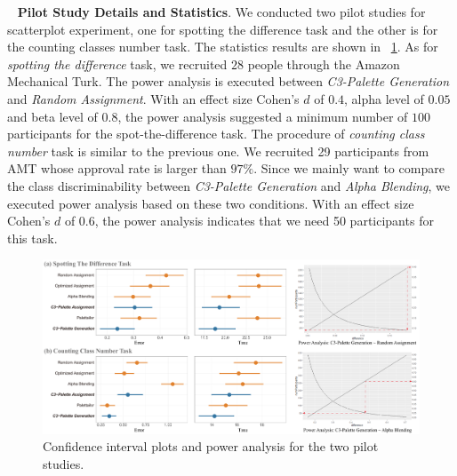 \documentclass[review,onecolumn]{vgtc}                %
\newcommand{\myparagraph}[1]{\mbox{\ } \newline \noindent \textbf{#1}}
\renewcommand{\paragraph}[1]{\myparagraph{#1}}
\begin{document}
\paragraph{Pilot Study Details and Statistics}.
We conducted two pilot studies for scatterplot experiment, one for spotting the difference task and the other is for the counting classes number task. The statistics results are shown in ~\ref{fig:pilotResults}.
As for \emph{spotting the difference} task, we recruited $28$ people through the Amazon Mechanical Turk. The power analysis is executed between \emph{C3-Palette Generation} and \emph{Random Assignment}. With an effect size Cohen's $d$ of $0.4$, alpha level of $0.05$ and beta level of $0.8$, the power analysis suggested a minimum number of $100$ participants for the spot-the-difference task.
The procedure of \emph{counting class number} task is similar to the previous one. We recruited 29 participants from AMT whose approval rate is larger than $97\%$. Since we mainly want to compare the class discriminability between \emph{C3-Palette Generation} and \emph{Alpha Blending}, we executed power analysis based on these two conditions.  With an effect size Cohen's $d$ of $0.6$, the power analysis indicates that we need 50 participants for this task.

\begin{figure}[h]
\centering
\includegraphics[width=1\linewidth]{user-result-pilot.pdf}
\caption{Confidence interval plots and power analysis for the two pilot studies.
}
\vspace*{-3mm}
\label{fig:pilotResults}
\end{figure}


\end{document}
